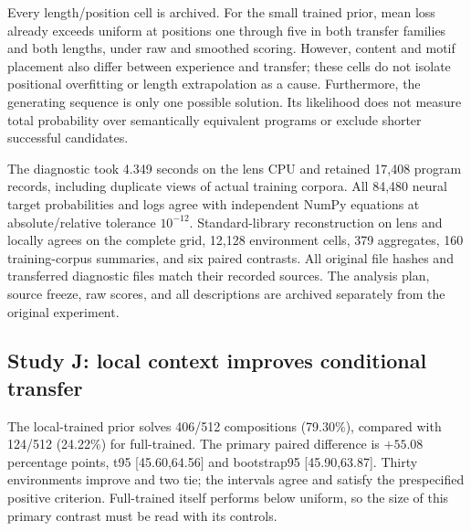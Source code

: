 \documentclass[11pt]{article}
\begin{document}
Every length/position cell is archived. For the small trained prior, mean
loss already exceeds uniform at positions one through five in both transfer
families and both lengths, under raw and smoothed scoring. However, content
and motif placement also differ between experience and transfer; these cells
do not isolate positional overfitting or length extrapolation as a cause.
Furthermore, the generating sequence is only one possible solution. Its
likelihood does not measure total probability over semantically equivalent
programs or exclude shorter successful candidates.

The diagnostic took 4.349 seconds on the lens CPU and retained 17,408 program
records, including duplicate views of actual training corpora. All 84,480
neural target probabilities and logs agree with independent NumPy equations
at absolute/relative tolerance $10^{-12}$. Standard-library reconstruction
on lens and locally agrees on the complete grid, 12,128 environment cells,
379 aggregates, 160 training-corpus summaries, and six paired contrasts.
All original file hashes and transferred diagnostic files match their
recorded sources. The analysis plan, source freeze, raw scores, and all
descriptions are archived separately from the original experiment.

\subsection{Study J: local context improves conditional transfer}
The local-trained prior solves 406/512 compositions (79.30\%), compared with
124/512 (24.22\%) for full-trained. The primary paired difference is
$+55.08$ percentage points, t95 [45.60,64.56] and bootstrap95 [45.90,63.87].
Thirty environments improve and two tie; the intervals agree and satisfy the
prespecified positive criterion. Full-trained itself performs below uniform,
so the size of this primary contrast must be read with its controls.
\end{document}
